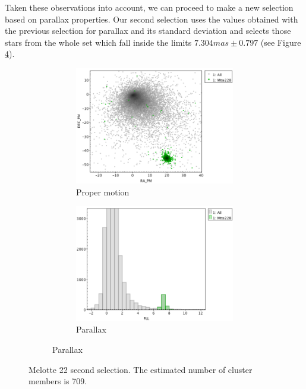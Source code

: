 \documentclass[11pt, a4paper, english]{book}
\begin{document}
Taken these observations into account, we can proceed to make a new selection based on parallax properties.
Our second selection uses the values obtained with the previous selection for parallax and its standard deviation and
selects those stars from the whole set which fall inside the limits $7.304mas \pm 0.797$ (see Figure \ref{fig:topcat_parallax_melotte_22}).

\begin{figure}[htbp]
  \centering
  \begin{subfigure}{0.9\textwidth}
    \centering
    \begin{subfigure}[t]{0.45\textwidth}
      \centering
      \includegraphics[width=\textwidth]{../figures/clusterix/topcat_2nd_selection_pm_melotte_22.png}
      \caption{Proper motion}
      \label{fig:topcat_2nd_selection_pm_melotte_22}
    \end{subfigure}
    \hfill
    \begin{subfigure}[t]{0.45\textwidth}
      \centering
      \includegraphics[width=\textwidth]{../figures/clusterix/topcat_2nd_selection_parallax_melotte_22.png}
      \caption{Parallax}
      \label{fig:topcat_2nd_selection_parallax_melotte_22}
    \end{subfigure}
  \end{subfigure}
  \caption{Melotte 22 second selection. The estimated number of cluster members is 709.}
  \label{fig:topcat_parallax_melotte_22}
\end{figure}
\end{document}
